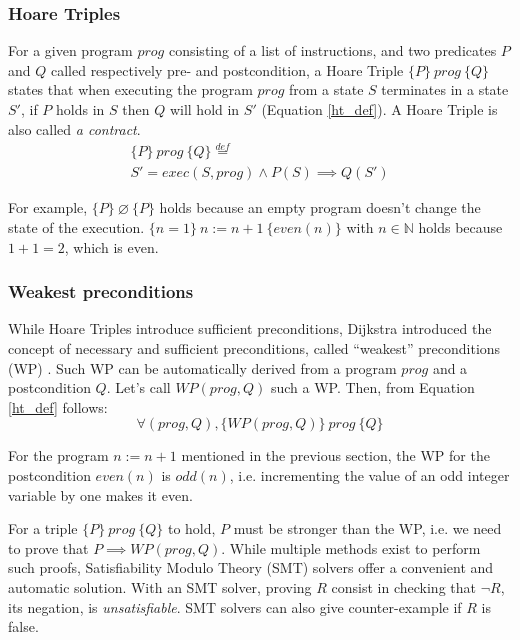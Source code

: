 \documentclass[10pt,a4paper]{article}
\newcommand{\htriple}[3]{\ensuremath{\{#1\}~#2~\{#3\}}}
\newcommand{\WP}{\ensuremath{\mathit{WP}}}
\newcommand{\eqdef}{\stackrel{def}{=}}
\begin{document}
\begin{multicols}{2}

\subsubsection{Hoare Triples} \label{hoare-triples}

For a given program $prog$ consisting of a list of instructions, and two predicates $P$ and $Q$ called respectively pre- and postcondition, a Hoare Triple \htriple{P}{prog}{Q} states that when executing the program $prog$ from a state $S$ terminates in a state $S'$, if $P$ holds in $S$ then $Q$ will hold in $S'$ (Equation \ref{ht_def}). A Hoare Triple is also called \textit{a contract}.
%
\begin{multline}
  \htriple{P}{prog}{Q} \eqdef\\
  S' = exec(S, prog) \land P(S) \implies Q(S')
  \label{ht_def}
\end{multline}

For example, \htriple{P}{\varnothing}{P} holds because an empty program doesn't change the state of the execution. \htriple{n=1}{n:=n+1}{even(n)} with $n \in \mathbb{N}$ holds because $1+1=2$, which is even.

\subsubsection{Weakest preconditions}

While Hoare Triples introduce sufficient preconditions, Dijkstra introduced the concept of necessary and sufficient preconditions, called ``weakest'' preconditions (WP) \cite{dijkstra_guarded_1975}. Such WP can be automatically derived from a program $prog$ and a postcondition $Q$. Let's call $\WP(prog, Q)$ such a WP. Then, from Equation \ref{ht_def} follows:
%
\begin{equation}
  \forall (prog, Q),
  \htriple{\WP(prog,Q)}{prog}{Q}
  \label{ht_wp_eq}
\end{equation}

For the program $n:=n+1$ mentioned in the previous section, the WP for the postcondition $even(n)$ is $odd(n)$, i.e. incrementing the value of an odd integer variable by one makes it even.

For a triple \htriple{P}{prog}{Q} to hold, $P$ must be stronger than the WP, i.e. we need to prove that $P \implies \WP(prog, Q)$. While multiple methods exist to perform such proofs, Satisfiability Modulo Theory ({SMT}) solvers offer a convenient and automatic solution. With an SMT solver, proving $R$ consist in checking that $\neg R$, its negation, is \textit{unsatisfiable}. SMT solvers can also give counter-example if $R$ is false.


\end{multicols}
\end{document}
